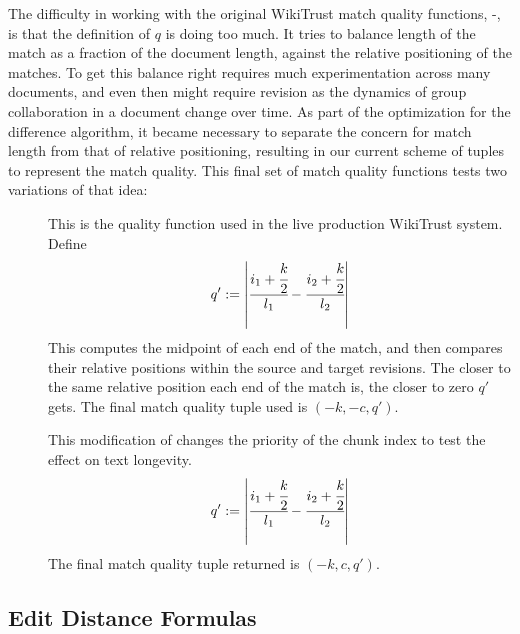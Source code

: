 The difficulty in working with the original WikiTrust
match quality functions, -,
is that the definition of $q$ is doing too much.
It tries to balance length of the match as a fraction
of the document length, against the relative positioning
of the matches.
To get this balance right requires much experimentation across
many documents, and even then might require revision as
the dynamics of group collaboration in a document change over time.
As part of the  optimization for the
difference algorithm, it became necessary to separate the
concern for match length from that of relative positioning,
resulting in our current scheme of tuples to represent
the match quality.
This final set of match quality functions tests two variations
of that idea:
%
\begin{description}

\item[] This is the quality function used in the
    live production WikiTrust system.
    Define
    \begin{equation*}
    q' := \left|\cfrac{ i_1 + \cfrac{k}{2} }{l_1}
            - \cfrac{ i_2 + \cfrac{k}{2} }{l_2} \right|
    \end{equation*}
    This computes the midpoint of each end of the match,
    and then compares their relative positions within
    the source and target revisions.
    The closer to the same relative position each end of
    the match is, the closer to zero $q'$ gets.
    The final match quality tuple used is $(-k, -c, q')$.

\item[] This modification of 
    changes the priority of the chunk index to test
    the effect on text longevity.
    \begin{equation*}
    q' := \left|\cfrac{ i_1 + \cfrac{k}{2} }{l_1}
            - \cfrac{ i_2 + \cfrac{k}{2} }{l_2} \right|
    \end{equation*}
    The final match quality tuple returned is $(-k, c, q')$.

\end{description}

\subsection{Edit Distance Formulas}

